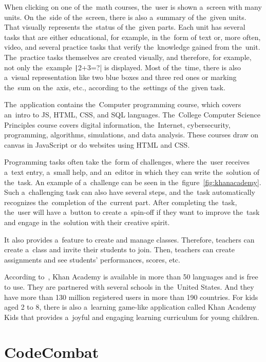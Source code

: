 \pagebreak
When clicking on one of the~math courses, the~user is shown a~screen with many units.
On the~side of the~screen, there is also a~summary of the~given units.
That visually represents the~status of the~given parts.
Each unit has several tasks that are either educational, for example, in the~form of text or, more often, video, and several practice tasks that verify the~knowledge gained from the~unit.
The~practice tasks themselves are created visually, and therefore, for example, not only the~example \texttt|2+3=?| is displayed.
Most of the~time, there is also a~visual representation like two blue boxes and three red ones or marking the~sum on the~axis, etc., according to the~settings of the~given task.

The~application contains the~Computer programming course, which covers an~intro to JS, HTML, CSS, and SQL languages.
The~College Computer Science Principles course covers digital information, the~Internet, cybersecurity, programming, algorithms, simulations, and data analysis.
These courses draw on canvas in JavaScript or do websites using HTML and CSS.

Programming tasks often take the~form of challenges, where the~user receives a~text entry, a~small help, and an~editor in which they can write the~solution of the~task.
An example of a~challenge can be seen in the~figure~\ref{fig:khanacademy}.
Such a~challenging task can also have several steps, and the~task automatically recognizes the~completion of the~current part.
After completing the~task, the~user will have a~button to create a~spin-off if they want to improve the~task and engage in the~solution with their creative spirit.

It also provides a~feature to create and manage classes.
Therefore, teachers can create a~class and invite their students to join.
Then, teachers can create assignments and see students' performances, scores, etc.

According to~\cite{a2022_khan}, Khan Academy is available in more than 50 languages and is free to use.
They are partnered with several schools in the~United States.
And they have more than 130 million registered users in more than 190 countries.
For kids aged 2 to 8, there is also a~learning game-like application called Khan Academy Kids that provides a~joyful and engaging learning curriculum for young children.

\section{CodeCombat}
\label{similar-games:code-combat}

